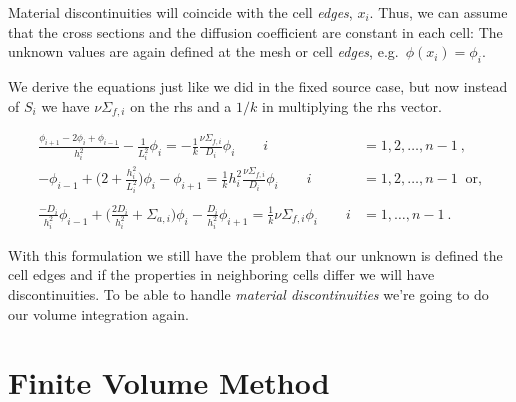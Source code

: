 \documentclass[12pt]{article}
\begin{document}
Material discontinuities will coincide with the cell \textit{edges}, $x_i$. Thus, we can assume that the cross sections and the diffusion coefficient are constant in each cell:
%
%
The unknown values are again defined at the mesh or cell \textit{edges}, e.g.\ $\phi(x_i) = \phi_i$.

We derive the equations just like we did in the fixed source case, but now instead of $S_i$ we have $\nu \Sigma_{f,i}$ on the rhs and a $1/k$ in multiplying the rhs vector.

\begin{align}
\frac{\phi_{i+1} - 2\phi_i + \phi_{i-1}}{h_i^2} - \frac{1}{L_i^2}\phi_i = -\frac{1}{k}\frac{\nu\Sigma_{f,i}}{D_i}\phi_i \qquad i &= 1, 2, \dots, n-1 \:,\nonumber \\
%
-\phi_{i-1} + \bigl(2 + \frac{h_i^2}{L_i^2}\bigr)\phi_i - \phi_{i+1} = \frac{1}{k} h_i^2 \frac{\nu\Sigma_{f,i}}{D_i}\phi_i \qquad i &= 1, 2, \dots, n-1\: \text{ or,} \nonumber\\
%
\nonumber \\
\frac{-D_i}{h_i^2}\phi_{i-1} + \biggl(\frac{2D_i}{h_i^2} + \Sigma_{a,i} \biggr)\phi_i - \frac{D_i}{h_i^2}\phi_{i+1} = \frac{1}{k} \nu\Sigma_{f,i}\phi_i \qquad i &= 1, \dots, n-1 \:.\nonumber 
\end{align}

With this formulation we still have the problem that our unknown is defined the cell edges and if the properties in neighboring cells differ we will have discontinuities. To be able to handle \textit{material discontinuities} we're going to do our volume integration again.


\section*{Finite Volume Method}
\end{document}
